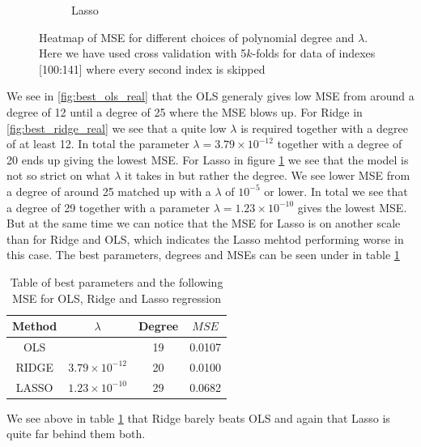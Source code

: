 \documentclass[12pt]{article}
\begin{document}
\begin{figure}[H]
\begin{subfigure}{.5\textwidth}
    \caption{Lasso}
    \label{fig:best_lasso_real}
  \end{subfigure}
  \caption{Heatmap of MSE for different choices of polynomial degree and $\lambda$. Here we have used cross validation with 5$k$-folds for data of indexes [100:141] where every second index is skipped}
  \label{fig:heat_real}
\end{figure}
We see in \ref{fig:best_ols_real} that the OLS generaly gives low MSE from around a degree of 12 until a degree of 25 where the MSE blows up. For Ridge in \ref{fig:best_ridge_real} we see that a quite low $\lambda$ is required together with a degree of at least 12. In total the parameter $\lambda =3.79 \times 10^{-12}$ together with a degree of 20 ends up giving the lowest MSE. For Lasso in figure \ref{fig:best_lasso_real} we see that the model is not so strict on what $\lambda$ it takes in but rather the degree. We see lower MSE from a degree of around 25 matched up with a $\lambda$ of $10^{-5}$ or lower. In total we see that a degree of 29 together with a parameter $\lambda=1.23\times10^{-10}$ gives the lowest MSE. But at the same time we can notice that the MSE for Lasso is on another scale than for Ridge and OLS, which indicates the Lasso mehtod performing worse in this case. The best parameters, degrees and MSEs can be seen under in table \ref{tab:best_comp_real}
\begin{table}[H]
  \centering
  \caption{Table of best parameters and the following MSE for OLS, Ridge and Lasso regression}
  \label{tab:best_comp_real}
  \begin{tabular}{|c||c|c|c|}
    \hline
    Method & $\lambda$ & Degree & $MSE$ \\
    \hline
    OLS &  & 19 & 0.0107 \\
    \hline
    RIDGE & $3.79\times10^{-12}$ & 20 & 0.0100 \\
    \hline
    LASSO & $1.23\times10^{-10}$ & 29 & 0.0682 \\
    \hline
  \end{tabular}
\end{table}
We see above in table \ref{tab:best_comp_real} that Ridge barely beats OLS and again that Lasso is quite far behind them both.
\end{document}
